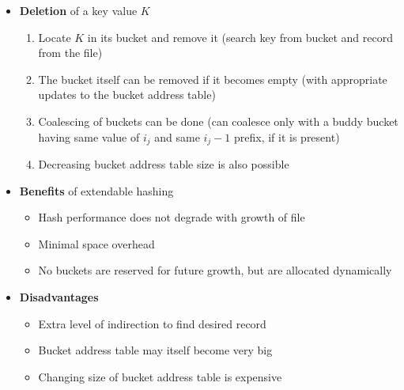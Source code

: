 \begin{itemize}[label=\(\rhd\)]
\begin{itemize}[label=\(\rhd\)]
\begin{enumerate}
\begin{itemize}[label=\(\rhd\)]
\begin{itemize}[label=\(\rhd\)]
                \end{itemize}
            \end{itemize}
        \end{enumerate}
        \item \textbf{Deletion} of a key value $K$
        \begin{enumerate}
            \item Locate $K$ in its bucket and remove it (search key from bucket and record from the file)
            \item The bucket itself can be removed if it becomes empty (with appropriate updates to the bucket address table)
            \item Coalescing of buckets can be done (can coalesce only with a buddy bucket having same value of $i_j$ and same $i_j-1$ prefix, if it is present)
            \item Decreasing bucket address table size is also possible
        \end{enumerate}
        \item \textbf{Benefits} of extendable hashing
        \begin{itemize}[label=\(\rhd\)]
            \item Hash performance does not degrade with growth of file
            \item Minimal space overhead
            \item No buckets are reserved for future growth, but are allocated dynamically
        \end{itemize}
        \item \textbf{Disadvantages}
        \begin{itemize}[label=\(\rhd\)]
            \item Extra level of indirection to find desired record
            \item Bucket address table may itself become very big
            \item Changing size of bucket address table is expensive
        \end{itemize}
    \end{itemize}
\end{itemize}

